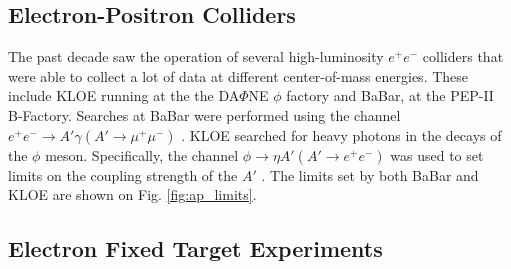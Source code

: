 \subsection{Electron-Positron Colliders}

The past decade saw the operation of several high-luminosity $e^+e^-$ colliders 
that were able to collect a lot of data at different center-of-mass energies.
These include KLOE running at the the DA$\Phi$NE $\phi$ factory and BaBar, 
at the PEP-II B-Factory. Searches at BaBar were performed using the channel 
$e^+e^- \rightarrow A' \gamma (A' \rightarrow \mu^+\mu^-)$ 
\cite{Reece:2009un, Aubert:2009cp}.  KLOE 
searched for heavy photons in the decays of the $\phi$ meson.  Specifically, 
the channel $\phi \rightarrow \eta A' (A' \rightarrow e^+e^-)$ was used to
set limits on the coupling strength of the $A'$ 
\cite{Babusci:2012cr, Archilli:2011zc}.
The limits set by both BaBar and KLOE are shown on Fig. \ref{fig:ap_limits}.

\subsection{Electron Fixed Target Experiments}
